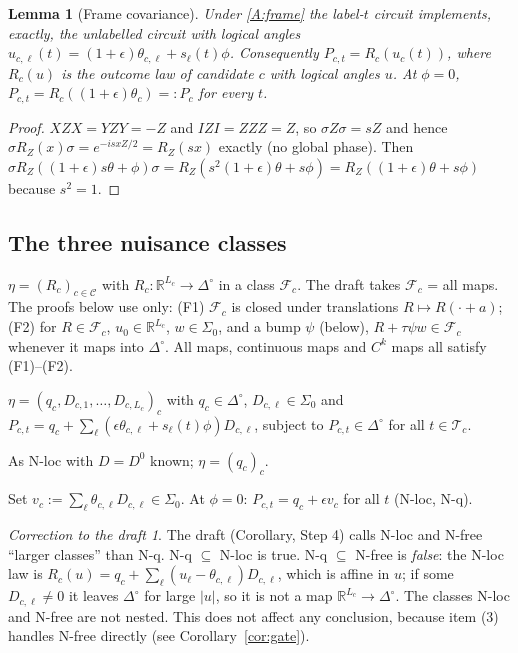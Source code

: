 \documentclass[11pt,a4paper]{article}
\newtheorem{lemma}[theorem]{Lemma}
\theoremstyle{definition}
\theoremstyle{remark}
\newtheorem*{correction}{Correction to the draft}
\newcommand{\R}{\mathbb{R}}
\newcommand{\C}{\mathcal{C}}
\newcommand{\T}{\mathcal{T}}
\newcommand{\simp}{\Delta^{\circ}}
\newcommand{\eps}{\epsilon}
\newcommand{\RZ}{R_Z}
\begin{document}
\begin{lemma}[Frame covariance]\label{lem:frame}
Under \ref{A:frame} the label-$t$ circuit implements, exactly, the unlabelled
circuit with logical angles
$u_{c,\ell}(t)=(1+\eps)\theta_{c,\ell}+s_\ell(t)\phi$. Consequently
$P_{c,t}=R_c(u_c(t))$, where $R_c(u)$ is the outcome law of candidate $c$ with
logical angles $u$. At $\phi=0$, $P_{c,t}=R_c((1+\eps)\theta_c)=:P_c$ for every $t$.
\end{lemma}
\begin{proof}
$XZX=YZY=-Z$ and $IZI=ZZZ=Z$, so $\sigma Z\sigma=s Z$ and hence
$\sigma\RZ(x)\sigma=e^{-isxZ/2}=\RZ(sx)$ exactly (no global phase). Then
$\sigma\RZ((1+\eps)s\theta+\phi)\sigma=\RZ(s^2(1+\eps)\theta+s\phi)
=\RZ((1+\eps)\theta+s\phi)$ because $s^2=1$.
\end{proof}

\subsection{The three nuisance classes}
\begin{description}[leftmargin=1.2em]
\item[N-free.] $\eta=(R_c)_{c\in\C}$ with $R_c:\R^{L_c}\to\simp$ in a class
$\mathcal F_c$. The draft takes $\mathcal F_c$ = all maps. The proofs below use
only: \textup{(F1)} $\mathcal F_c$ is closed under translations
$R\mapsto R(\cdot+a)$; \textup{(F2)} for $R\in\mathcal F_c$, $u_0\in\R^{L_c}$,
$w\in\Sigma_0$, and a bump $\psi$ (below), $R+\tau\psi w\in\mathcal F_c$ whenever it
maps into $\simp$. All maps, continuous maps and $C^k$ maps all satisfy (F1)--(F2).
\item[N-loc.] $\eta=(q_c,D_{c,1},\dots,D_{c,L_c})_c$ with $q_c\in\simp$,
$D_{c,\ell}\in\Sigma_0$ and
$P_{c,t}=q_c+\sum_\ell(\eps\theta_{c,\ell}+s_\ell(t)\phi)D_{c,\ell}$,
subject to $P_{c,t}\in\simp$ for all $t\in\T_c$.
\item[N-q.] As N-loc with $D=D^0$ known; $\eta=(q_c)_c$.
\end{description}
Set $v_c:=\sum_\ell\theta_{c,\ell}D_{c,\ell}\in\Sigma_0$. At $\phi=0$:
$P_{c,t}=q_c+\eps v_c$ for all $t$ (N-loc, N-q).

\begin{correction}
The draft (Corollary, Step 4) calls N-loc and N-free ``larger classes'' than N-q.
N-q $\subseteq$ N-loc is true. N-q $\subseteq$ N-free is \emph{false}: the
N-loc law is $R_c(u)=q_c+\sum_\ell(u_\ell-\theta_{c,\ell})D_{c,\ell}$, which is affine
in $u$; if some $D_{c,\ell}\neq0$ it leaves $\simp$ for large $|u|$, so it is not a
map $\R^{L_c}\to\simp$. The classes N-loc and N-free are not nested. This does not
affect any conclusion, because item (3) handles N-free directly
(see Corollary~\ref{cor:gate}).
\end{correction}
\end{document}
